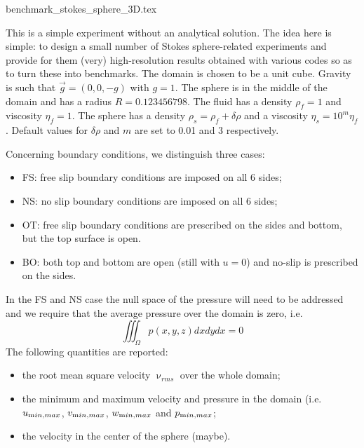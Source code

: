 \begin{flushright} {\tiny {\color{gray} benchmark\_stokes\_sphere\_3D.tex}} \end{flushright}

This is a simple experiment without an analytical solution. The idea here is simple: to design
a small number of Stokes sphere-related experiments and provide for them (very) high-resolution results 
obtained with various codes so as to turn these into benchmarks. 
The domain is chosen to be a unit cube. Gravity is such that $\vec{g}=(0,0,-g)$ with $g=1$. 
The sphere is in the middle of the domain and has a radius $R=0.123456798$.
The fluid has a density $\rho_f=1$ and viscosity $\eta_f=1$. The sphere has a density $\rho_s=\rho_f+\delta\rho$
and a viscosity $\eta_s=10^m \eta_f$. Default values for $\delta\rho$ and $m$ are set to 0.01 and 3 respectively.

Concerning boundary conditions, we distinguish three cases:
\begin{itemize}
\item FS: free slip boundary conditions are imposed on all 6 sides;
\item NS: no slip boundary conditions are imposed on all 6 sides;
\item OT: free slip boundary conditions are prescribed on the sides and bottom, but the top surface is open.
\item BO: both top and bottom are open (still with $u=0$) and no-slip is prescribed on the sides.
\end{itemize}

In the FS and NS case the null space of the pressure will need to be addressed and we require that the average 
pressure over the domain is zero, i.e.
\[
\iiint_\Omega p(x,y,z) dxdydx = 0
\]
The following quantities are reported:
\begin{itemize}
\item the root mean square velocity $\upnu_{rms}$ over the whole domain;
\item the minimum and maximum velocity and pressure in the domain (i.e. $u_{\text min,max}$, $v_{\text min,max}$,
      $w_{\text min,max}$ and $p_{\text min,max}$;
\item the velocity in the center of the sphere (maybe).
\end{itemize}

